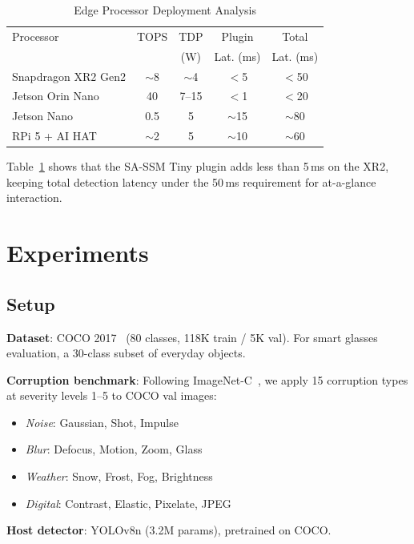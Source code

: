\documentclass[conference]{IEEEtran}
\begin{document}
\begin{table}[t]
\centering
\caption{Edge Processor Deployment Analysis}
\label{tab:edge_hw}
\small
\begin{tabular}{@{}lcccc@{}}
\toprule
Processor & TOPS & TDP & Plugin & Total \\
& & (W) & Lat. (ms) & Lat. (ms) \\
\midrule
Snapdragon XR2 Gen2 & $\sim$8 & $\sim$4 & $<$5 & $<$50 \\
Jetson Orin Nano & 40 & 7--15 & $<$1 & $<$20 \\
Jetson Nano & 0.5 & 5 & $\sim$15 & $\sim$80 \\
RPi 5 + AI HAT & $\sim$2 & 5 & $\sim$10 & $\sim$60 \\
\bottomrule
\end{tabular}
\end{table}

Table~\ref{tab:edge_hw} shows that the SA-SSM Tiny plugin adds less than 5\,ms on the XR2, keeping total detection latency under the 50\,ms requirement for at-a-glance interaction.

\section{Experiments}
\label{sec:experiments}

\subsection{Setup}

\textbf{Dataset}: COCO 2017~\cite{lin2014microsoft} (80 classes, 118K train / 5K val). For smart glasses evaluation, a 30-class subset of everyday objects.

\textbf{Corruption benchmark}: Following ImageNet-C~\cite{hendrycks2019benchmarking}, we apply 15 corruption types at severity levels 1--5 to COCO val images:
\begin{itemize}
\item \emph{Noise}: Gaussian, Shot, Impulse
\item \emph{Blur}: Defocus, Motion, Zoom, Glass
\item \emph{Weather}: Snow, Frost, Fog, Brightness
\item \emph{Digital}: Contrast, Elastic, Pixelate, JPEG
\end{itemize}

\textbf{Host detector}: YOLOv8n (3.2M params), pretrained on COCO.
\end{document}
